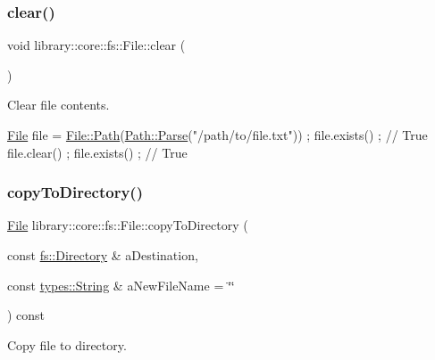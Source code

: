 \subsubsection{\texorpdfstring{clear()}{clear()}}
{\footnotesize\ttfamily void library\+::core\+::fs\+::\+File\+::clear (\begin{DoxyParamCaption}{ }\end{DoxyParamCaption})}



Clear file contents. 


\begin{DoxyCode}
\hyperlink{classlibrary_1_1core_1_1fs_1_1_file_a7490060f19a21d4ee58bb6cec87a1ca6}{File} file = \hyperlink{classlibrary_1_1core_1_1fs_1_1_file_a0e0d8a8becb3cdd21775554e181452d8}{File::Path}(\hyperlink{classlibrary_1_1core_1_1fs_1_1_path_aebf5bd3af83e0b7376616e146f3e55df}{Path::Parse}(\textcolor{stringliteral}{"/path/to/file.txt"})) ;
file.exists() ; \textcolor{comment}{// True}
file.clear() ;
file.exists() ; \textcolor{comment}{// True}
\end{DoxyCode}
 \mbox{\label{classlibrary_1_1core_1_1fs_1_1_file_a97b8b2deee991e5eefb78e811806788d}} 
\subsubsection{\texorpdfstring{copy\+To\+Directory()}{copyToDirectory()}}
{\footnotesize\ttfamily \hyperlink{classlibrary_1_1core_1_1fs_1_1_file}{File} library\+::core\+::fs\+::\+File\+::copy\+To\+Directory (\begin{DoxyParamCaption}\item[{const \hyperlink{classlibrary_1_1core_1_1fs_1_1_directory}{fs\+::\+Directory} \&}]{a\+Destination,  }\item[{const \hyperlink{classlibrary_1_1core_1_1types_1_1_string}{types\+::\+String} \&}]{a\+New\+File\+Name = {\ttfamily \char`\"{}\char`\"{}} }\end{DoxyParamCaption}) const}



Copy file to directory. 


